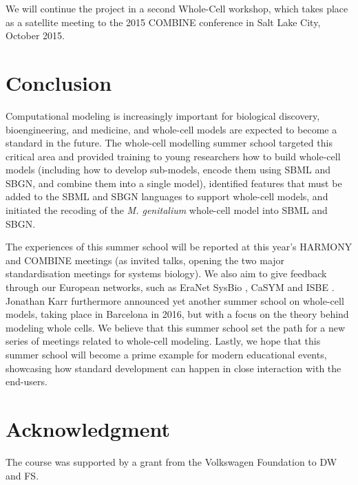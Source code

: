 \documentclass[journal,transmag]{IEEEtran}
\begin{document}
We will continue the project in a second Whole-Cell workshop, which takes place as a satellite meeting to the 2015 COMBINE conference in Salt Lake City, October 2015.

\section{Conclusion}
Computational modeling is increasingly important for biological discovery, bioengineering, and medicine, and whole-cell models are expected to become a standard in the future. 
The whole-cell modelling summer school targeted this critical area and  provided  training to young researchers how to build whole-cell models (including how to develop sub-models, encode them using SBML and SBGN, and  combine them into a single model), identified features that must be added to the SBML and SBGN languages to support  whole-cell models, and initiated the recoding of the \textit{M. genitalium} whole-cell model into SBML and SBGN.

The experiences of this summer school will be reported at this year's HARMONY and COMBINE meetings (as invited talks, opening the two major standardisation meetings for
systems biology). 
We also aim to give feedback through our European networks, such as EraNet SysBio \cite{ERASysBio2015}, CaSYM \cite{CaSYM2015} and ISBE \cite{Wolkenhauer2009}.
Jonathan Karr furthermore announced yet another summer school on whole-cell models, taking place in Barcelona in 2016, but with a focus on the theory behind modeling whole cells.
We believe that this summer school set the path for a new series of meetings related to whole-cell modeling.
Lastly, we hope that this summer school will become a prime example for modern educational events, showcasing how standard development can happen in close interaction with the end-users.

\section*{Acknowledgment}
The course was supported by a grant from the Volkswagen Foundation to DW and FS. 

\ifCLASSOPTIONcaptionsoff
  \newpage
\fi




% 
\end{document}
